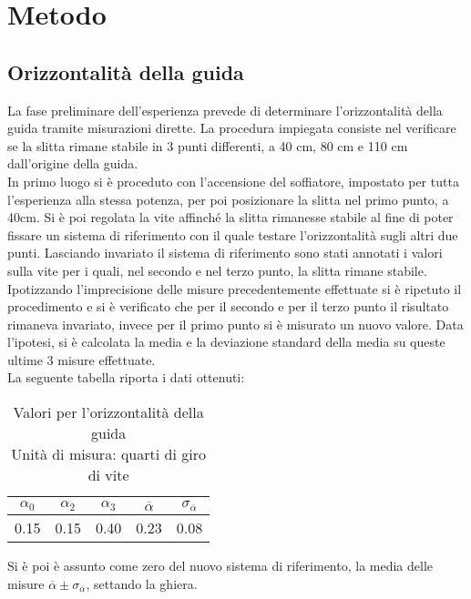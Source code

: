 \documentclass[a4paper,11pt,oneside]{article}
\begin{document}
\section{Metodo}
\subsection{Orizzontalità della guida}
La fase preliminare dell'esperienza prevede di determinare l'orizzontalità della guida tramite misurazioni dirette. La procedura impiegata consiste nel verificare se la slitta rimane stabile in 3 punti differenti, a 40 \si{cm}, 80 \si{cm} e 110 \si{cm} dall'origine della guida.\\
In primo luogo si è proceduto con l'accensione del soffiatore, impostato per tutta l'esperienza alla stessa potenza, per poi posizionare la slitta nel primo punto, a 40cm. Si è poi regolata la vite affinché la slitta rimanesse stabile al fine di poter fissare un sistema di riferimento con il quale testare l'orizzontalità sugli altri due punti. Lasciando invariato il sistema di riferimento sono stati annotati i valori sulla vite per i quali, nel secondo e nel terzo punto, la slitta rimane stabile.\\
Ipotizzando l'imprecisione delle misure precedentemente effettuate si è ripetuto il procedimento e si è verificato che per il secondo e per il terzo punto il risultato rimaneva invariato, invece per il primo punto si è misurato un nuovo valore. Data l'ipotesi, si è calcolata la media e la deviazione standard della media su queste ultime 3 misure effettuate.\\
La seguente tabella riporta i dati ottenuti:

\begin{table}[h!]
    \centering
    \caption{Valori per l'orizzontalità della guida \\ Unità di misura: quarti di giro di vite}
\begin{tabular}{ccc|cc}
    \toprule
    $\alpha_{0}$&$\alpha_{2}$&$\alpha_{3}$&$\overline{\alpha}$&$\sigma_{\overline{\alpha}}$\\
    \midrule
    0.15&0.15&0.40&0.23&0.08\\
    \bottomrule
    \end{tabular}
    \label{tab:guida_orizzontale}
\end{table}

Si è poi è assunto come zero del nuovo sistema di riferimento, la media delle misure $\overline{\alpha} \pm \sigma_{\overline{\alpha}}$, settando la ghiera.\\
\end{document}

